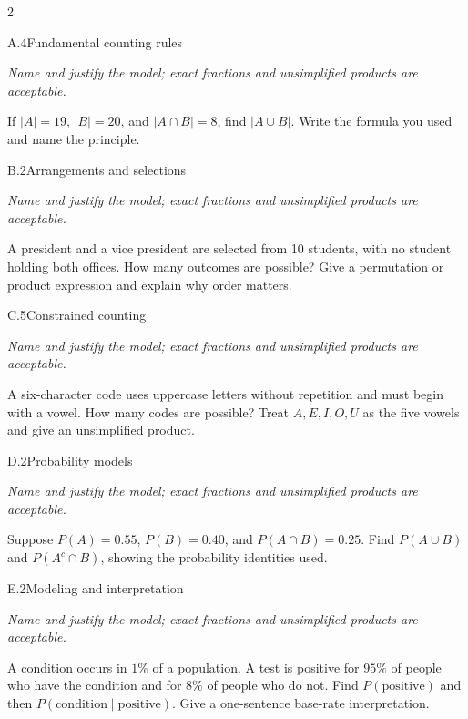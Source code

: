 \documentclass[9pt]{extarticle}
\begin{document}
\begin{multicols}{2}
\begin{CoreProblem}{A.4}{Fundamental counting rules}
{\scriptsize\textit{Name and justify the model; exact fractions and unsimplified products are acceptable.}\par}
If $|A|=19$, $|B|=20$, and $|A\cap B|=8$, find $|A\cup B|$. Write
    the formula you used and name the principle.
\end{CoreProblem}
\begin{CoreProblem}{B.2}{Arrangements and selections}
{\scriptsize\textit{Name and justify the model; exact fractions and unsimplified products are acceptable.}\par}
A president and a vice president are selected from 10 students, with
    no student holding both offices. How many outcomes are possible? Give a
    permutation or product expression and explain why order matters.
\end{CoreProblem}
\begin{CoreProblem}{C.5}{Constrained counting}
{\scriptsize\textit{Name and justify the model; exact fractions and unsimplified products are acceptable.}\par}
A six-character code uses uppercase letters without repetition and
    must begin with a vowel. How many codes are possible? Treat
    $A,E,I,O,U$ as the five vowels and give an unsimplified product.
\end{CoreProblem}
\columnbreak
\begin{CoreProblem}{D.2}{Probability models}
{\scriptsize\textit{Name and justify the model; exact fractions and unsimplified products are acceptable.}\par}
Suppose $P(A)=0.55$, $P(B)=0.40$, and $P(A\cap B)=0.25$. Find
    $P(A\cup B)$ and $P(A^c\cap B)$, showing the probability identities used.
\end{CoreProblem}
\begin{CoreProblem}{E.2}{Modeling and interpretation}
{\scriptsize\textit{Name and justify the model; exact fractions and unsimplified products are acceptable.}\par}
A condition occurs in $1\%$ of a population. A test is positive for
    $95\%$ of people who have the condition and for $8\%$ of people who do not.
    Find $P(\text{positive})$ and then
    $P(\text{condition}\mid\text{positive})$. Give a one-sentence base-rate
    interpretation.
\end{CoreProblem}
\end{multicols}
\CoreWorkArea
\FormBreak
\end{document}
